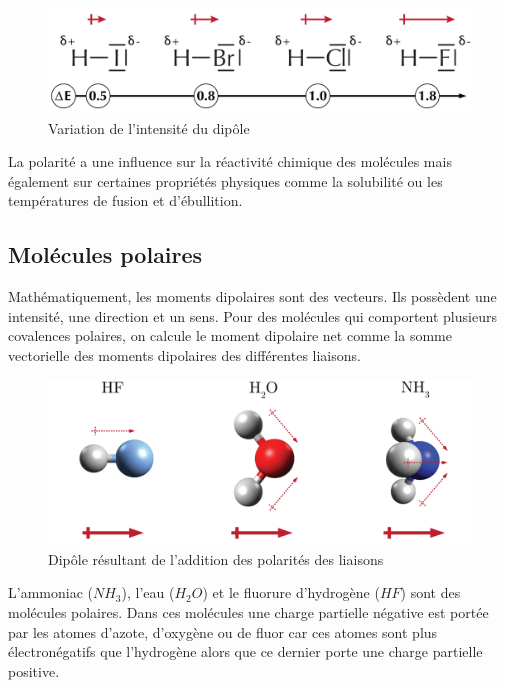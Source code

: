 \documentclass[
  11pt,
  a4paper,
  openany]{book}
\begin{document}
\begin{figure}

{\centering \includegraphics[width=0.6\linewidth]{images/dipole-0} 

}

\caption{Variation de l'intensité du dipôle}\label{fig:dipole-0}
\end{figure}

La polarité a une influence sur la réactivité chimique des molécules mais également sur certaines propriétés physiques comme la solubilité ou les températures de fusion et d'ébullition.

\subsection{Molécules polaires}\label{moluxe9cules-polaires}

Mathématiquement, les moments dipolaires sont des vecteurs. Ils possèdent une intensité, une direction et un sens. Pour des molécules qui comportent plusieurs covalences polaires, on calcule le moment dipolaire net comme la somme vectorielle des moments dipolaires des différentes liaisons.

\begin{figure}

{\centering \includegraphics[width=0.6\linewidth]{images/dipole-1} 

}

\caption{Dipôle résultant de l'addition des polarités des liaisons}\label{fig:dipole-1}
\end{figure}

L'ammoniac (\(NH_3\)), l'eau (\(H_2O\)) et le fluorure d'hydrogène (\(HF\)) sont des molécules polaires. Dans ces molécules une charge partielle négative est portée par les atomes d'azote, d'oxygène ou de fluor car ces atomes sont plus électronégatifs que l'hydrogène alors que ce dernier porte une charge partielle positive.
\end{document}
